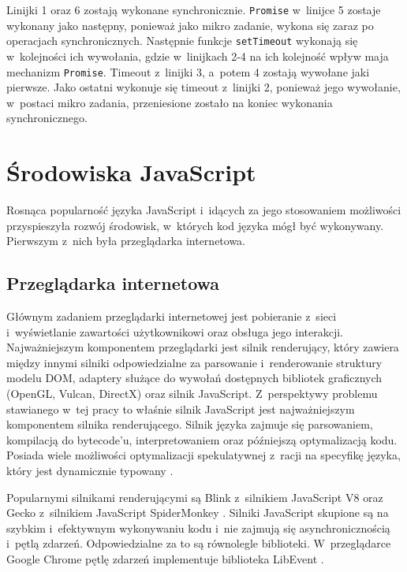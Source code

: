 Linijki 1 oraz 6 zostają wykonane synchronicznie. \lstinline{Promise} w~linijce 5 zostaje wykonany jako następny, ponieważ jako mikro zadanie, wykona się zaraz po operacjach synchronicznych. Następnie funkcje \lstinline{setTimeout} wykonają się w~kolejności ich wywołania, gdzie w~linijkach 2-4 na ich kolejność wpływ maja mechanizm \lstinline{Promise}. Timeout z~linijki 3, a~potem 4 zostają wywołane jaki pierwsze. Jako ostatni wykonuje się timeout z~linijki 2, ponieważ jego wywołanie, w~postaci mikro zadania, przeniesione zostało na koniec wykonania synchronicznego.

\section{Środowiska JavaScript}
\label{sec:env-modules}

Rosnąca popularność języka JavaScript i~idących za jego stosowaniem możliwości przyspieszyła rozwój środowisk, w~których kod języka mógł być wykonywany. Pierwszym z~nich była przeglądarka internetowa. 

\subsection{Przeglądarka internetowa}

Głównym zadaniem przeglądarki internetowej jest pobieranie z~sieci i~wyświetlanie zawartości użytkownikowi oraz obsługa jego interakcji. Najważniejszym komponentem przeglądarki jest silnik renderujący, który zawiera między innymi silniki odpowiedzialne za parsowanie i~renderowanie struktury modelu DOM, adaptery służące do wywołań dostępnych bibliotek graficznych (OpenGL, Vulcan, DirectX) oraz silnik JavaScript. Z~perspektywy problemu stawianego w~tej pracy to właśnie silnik JavaScript jest najważniejszym komponentem silnika renderującego. Silnik języka zajmuje się parsowaniem, kompilacją do bytecode'u, interpretowaniem oraz późniejszą optymalizacją kodu. Posiada wiele możliwości optymalizacji spekulatywnej z~racji na specyfikę języka, który jest dynamicznie typowany \cite{meurer_2017}.

Popularnymi silnikami renderującymi są Blink z~silnikiem JavaScript V8 \cite{V8} oraz Gecko z~silnikiem JavaScript SpiderMonkey \cite{spidermonkey}. Silniki JavaScript skupione są na szybkim i~efektywnym wykonywaniu kodu i~nie zajmują się asynchronicznością i~pętlą zdarzeń. Odpowiedzialne za to są równolegle biblioteki. W~przeglądarce Google Chrome pętlę zdarzeń implementuje biblioteka LibEvent \cite{libevent}.

